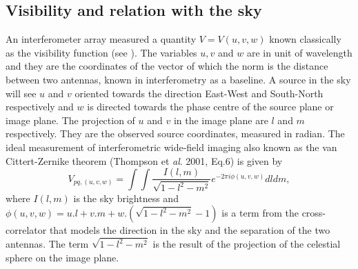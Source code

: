 \documentclass[useAMS,usenatbib]{mn2e}
\begin{document}
\subsection{Visibility and relation with the sky }
\label{sec:visSky}
An interferometer array measured a quantity $V=V(u,v,w)$ known classically as the visibility function (see \cite{5}).
The variables $u,v$ and $w$ are in unit of wavelength and they are the coordinates of the vector of which the norm is the distance between 
two antennas, known in interferometry as a baseline. A source in the sky will see $u$ and $v$ oriented towards the direction East-West and 
South-North respectively and $w$ is directed towards the phase centre of the source plane or image plane. The projection of $u$ and $v$ in 
the image plane are $l$ and $m$ respectively. They are the observed source coordinates, measured in radian. The ideal measurement of 
interferometric wide-field imaging also known as the van Cittert-Zernike theorem (Thompson et \textit{al}. 2001, Eq.6) is given by
\begin{equation}
 V_{pq,(u,v,w)}=\int \int \frac{I(l,m)}{\sqrt{1-l^2 - m^2}}e^{-2\pi i \phi (u,v,w)}dldm, \label{eq1:visSky}
\end{equation} 
where $I(l,m)$ is the sky brightness and $\phi(u,v,w)=u.l+v.m+w.(\sqrt{1-l^2 - m^2}-1)$ is a term from the cross-correlator that models the 
direction in the sky and the separation of the two antennas. The term $\sqrt{1-l^2 - m^2}$ is the result of the projection of the celestial 
sphere on the image plane.
% 
\end{document}
